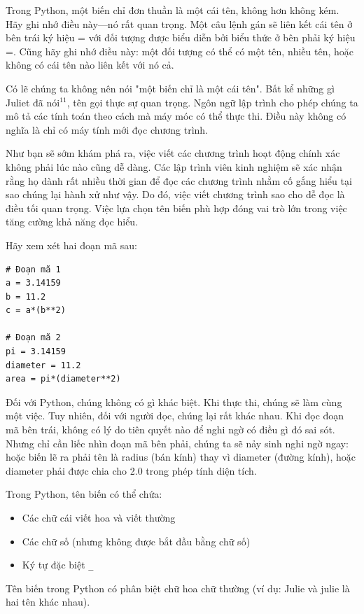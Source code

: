 Trong Python, một biến chỉ đơn thuần là một cái tên, không hơn không kém. Hãy ghi nhớ điều này—nó rất quan trọng. Một câu lệnh gán sẽ liên kết cái tên ở bên trái ký hiệu = với đối tượng được biểu diễn bởi biểu thức ở bên phải ký hiệu =. Cũng hãy ghi nhớ điều này: một đối tượng có thể có một tên, nhiều tên, hoặc không có cái tên nào liên kết với nó cả.

Có lẽ chúng ta không nên nói "một biến chỉ là một cái tên". Bất kể những gì Juliet đã nói$^{11}$, tên gọi thực sự quan trọng. Ngôn ngữ lập trình cho phép chúng ta mô tả các tính toán theo cách mà máy móc có thể thực thi. Điều này không có nghĩa là chỉ có máy tính mới đọc chương trình.

Như bạn sẽ sớm khám phá ra, việc viết các chương trình hoạt động chính xác không phải lúc nào cũng dễ dàng. Các lập trình viên kinh nghiệm sẽ xác nhận rằng họ dành rất nhiều thời gian để đọc các chương trình nhằm cố gắng hiểu tại sao chúng lại hành xử như vậy. Do đó, việc viết chương trình sao cho dễ đọc là điều tối quan trọng. Việc lựa chọn tên biến phù hợp đóng vai trò lớn trong việc tăng cường khả năng đọc hiểu.

Hãy xem xét hai đoạn mã sau:

\begin{verbatim}
# Đoạn mã 1
a = 3.14159    
b = 11.2    
c = a*(b**2)   

# Đoạn mã 2
pi = 3.14159 
diameter = 11.2 
area = pi*(diameter**2)
\end{verbatim}

Đối với Python, chúng không có gì khác biệt. Khi thực thi, chúng sẽ làm cùng một việc. Tuy nhiên, đối với người đọc, chúng lại rất khác nhau. Khi đọc đoạn mã bên trái, không có lý do tiên quyết nào để nghi ngờ có điều gì đó sai sót. Nhưng chỉ cần liếc nhìn đoạn mã bên phải, chúng ta sẽ nảy sinh nghi ngờ ngay: hoặc biến lẽ ra phải tên là radius (bán kính) thay vì diameter (đường kính), hoặc diameter phải được chia cho 2.0 trong phép tính diện tích.

Trong Python, tên biến có thể chứa:
\begin{itemize}
    \item Các chữ cái viết hoa và viết thường
    \item Các chữ số (nhưng không được bắt đầu bằng chữ số)
    \item Ký tự đặc biệt \texttt{\_}
\end{itemize}

Tên biến trong Python có phân biệt chữ hoa chữ thường (ví dụ: Julie và julie là hai tên khác nhau).

